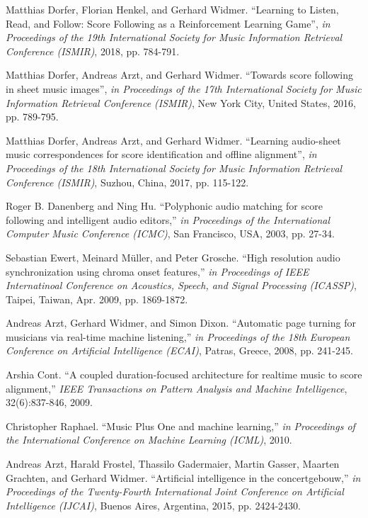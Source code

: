\documentclass[letterpaper, 10pt, conference]{ieeeconf}  %
\begin{document}
\begin{thebibliography}{99}
Matthias Dorfer, Florian Henkel, and Gerhard Widmer.
``Learning to Listen, Read, and Follow: Score Following as a Reinforcement Learning Game'', 
\textit{in Proceedings of the 19th International Society for Music Information Retrieval Conference (ISMIR)}, 2018, pp. 784-791.

Matthias Dorfer, Andreas Arzt, and Gerhard Widmer.
``Towards score following in sheet music images'', 
\textit{in Proceedings of the 17th International Society for Music Information Retrieval Conference (ISMIR)}, New York City, United States, 2016, pp. 789-795.

Matthias Dorfer, Andreas Arzt, and Gerhard Widmer.
``Learning audio-sheet music correspondences for score identification  and  offline alignment'', 
\textit{in Proceedings of the 18th  International Society for Music Information Retrieval Conference (ISMIR)}, Suzhou, China, 2017, pp. 115-122.

Roger B. Danenberg and Ning Hu.
``Polyphonic audio matching for score following and intelligent audio editors,''
\textit{in Proceedings of the International Computer Music Conference (ICMC)}, San Francisco, USA, 2003, pp. 27-34.
 
Sebastian Ewert, Meinard M\"uller, and Peter Grosche.
``High resolution audio synchronization using chroma onset features,''
\textit{in Proceedings of IEEE Internatinoal Conference on Acoustics, Speech, and Signal Processing (ICASSP)}, Taipei, Taiwan, Apr. 2009, pp. 1869-1872.

Andreas Arzt, Gerhard Widmer, and Simon Dixon.
``Automatic page turning for musicians via real-time machine listening,''
\textit{in Proceedings of the 18th European Conference on Artificial Intelligence (ECAI)}, Patras, Greece, 2008, pp. 241-245.

Arshia Cont. 
``A coupled duration-focused architecture for realtime music to score alignment,''
\textit{IEEE Transactions on Pattern Analysis and Machine Intelligence}, 32(6):837-846, 2009.

Christopher Raphael.  
``Music  Plus  One  and  machine learning,'' 
\textit{in Proceedings of the International Conference on Machine Learning (ICML)}, 2010.

Andreas Arzt, Harald  Frostel, Thassilo Gadermaier, Martin Gasser, Maarten Grachten, and Gerhard Widmer.  
``Artificial intelligence in the concertgebouw,''  
\textit{in Proceedings of the Twenty-Fourth International Joint Conference on Artificial Intelligence (IJCAI)}, Buenos Aires, Argentina, 2015, pp. 2424-2430. 


\end{thebibliography}
\end{document}
